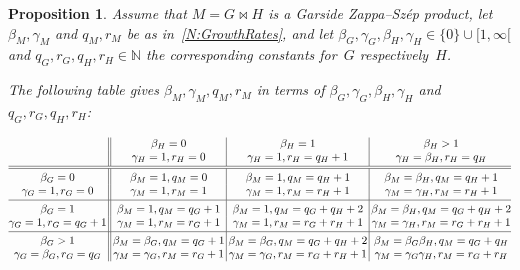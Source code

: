 \documentclass[a4paper,final]{article}
\let\zs=\bowtie
\theoremstyle{plain}
\newtheorem{proposition}[proposition]{Proposition}
\theoremstyle{remark}
\theoremstyle{definition}
\begin{document}
\begin{proposition}\label{P:GrowthRatesProduct}
Assume that $M=G\zs H$ is a Garside {Zappa--Sz{\'e}p}{} product, let $\beta_M,\gamma_M$ and $q_M,r_M$ be as in~\autoref{N:GrowthRates}, and let $\beta_G,\gamma_G,\beta_H,\gamma_H\in\{0\}\cup[1,\infty[$ and $q_G,r_G,q_H,r_H\in{\mathbb{N}}$ the corresponding constants for~$G$ respectively~$H$.

The following table gives $\beta_M,\gamma_M,q_M,r_M$ in terms of $\beta_G,\gamma_G,\beta_H,\gamma_H$ and $q_G,r_G,q_H,r_H$:
\vspace*{-2ex}

{\tiny
\[
\begin{array}{@{}c@{\,}||@{\,}c@{\,}|@{\,}c@{\,}|@{\,}c@{}}
                          & \beta_H=0             & \beta_H=1                 & \beta_H>1                   \\
                          & \gamma_H=1, r_H=0     & \gamma_H=1, r_H=q_H+1     & \gamma_H=\beta_H, r_H=q_H
\rule[-1.2ex]{0pt}{2.5ex}\\ \hline\hline\rule{0pt}{2.5ex}
\beta_G=0                 & \beta_M=1, q_M=0      & \beta_M=1, q_M=q_H+1      & \beta_M=\beta_H, q_M=q_H+1  \\
\gamma_G=1, r_G=0         & \gamma_M=1, r_M=1     & \gamma_M=1, r_M=r_H+1     & \gamma_M=\gamma_H, r_M=r_H+1
\rule[-1.2ex]{0pt}{2.5ex}\\ \hline\rule{0pt}{2.5ex}
\beta_G=1                 & \beta_M=1, q_M=q_G+1  & \beta_M=1, q_M=q_G+q_H+2  & \beta_M=\beta_H, q_M=q_G+q_H+2    \\
\gamma_G=1, r_G=q_G+1     & \gamma_M=1, r_M=r_G+1 & \gamma_M=1, r_M=r_G+r_H+1 & \gamma_M=\gamma_H, r_M=r_G+r_H+1
\rule[-1.2ex]{0pt}{2.5ex}\\ \hline\rule{0pt}{2.5ex}
\beta_G>1                 & \beta_M=\beta_G, q_M=q_G+1  & \beta_M=\beta_G, q_M=q_G+q_H+2  & \beta_M=\beta_G\beta_H, q_M=q_G+q_H \\
\gamma_G=\beta_G, r_G=q_G & \gamma_M=\gamma_G, r_M=r_G+1 & \gamma_M=\gamma_G, r_M=r_G+r_H+1 & \gamma_M=\gamma_G\gamma_H, r_M=r_G+r_H \\
\end{array}
\]
}
\end{proposition}
\end{document}
